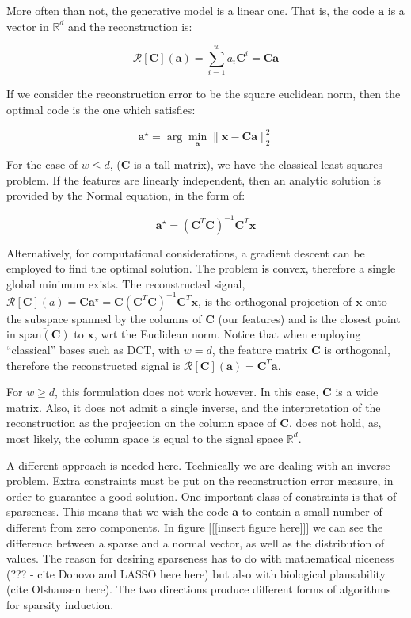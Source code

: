 \documentclass[12pt,a4paper,oneside,english]{UPBThesis}
\newcommand{\hcsignalspace}{\mathbb{R}^d}
\begin{document}
More often than not, the generative model is a linear one. That is, the code $\textbf{a}$ is a vector in $\hcsignalspace$ and the reconstruction is:

\begin{equation*}
\mathcal{R}[\textbf{C}](\textbf{a}) = \sum_{i=1}^{w}{a_i \textbf{C}^i} = \textbf{C}\textbf{a}
\end{equation*}

If we consider the reconstruction error to be the square euclidean norm, then the optimal code is the one which satisfies:

\begin{equation}
\textbf{a}^{\star} = \arg\min_{\textbf{a}} \| \textbf{x} - \textbf{C}\textbf{a} \|_2^2
\end{equation}

For the case of $w \leq d$, ($\textbf{C}$ is a tall matrix), we have the classical least-squares problem. If the features are linearly independent, then an analytic solution is provided by the Normal equation, in the form of:

\begin{equation}
\textbf{a}^{\star} = (\textbf{C}^T\textbf{C})^{-1}\textbf{C}^T\textbf{x}
\end{equation}

Alternatively, for computational considerations, a gradient descent can be employed to find the optimal solution. The problem is convex, therefore a single global minimum exists. The reconstructed signal, $\mathcal{R}[\textbf{C}](a) = \textbf{C}\textbf{a}^{\star} = \textbf{C}(\textbf{C}^T\textbf{C})^{-1}\textbf{C}^T\textbf{x}$, is the orthogonal projection of $\textbf{x}$ onto the subspace spanned by the columns of $\textbf{C}$ (our features) and is the closest point in $\overline{\text{span}(\textbf{C})}$ to $\textbf{x}$, wrt the Euclidean norm. Notice that when employing ``classical'' bases such as DCT, with $w = d$, the feature matrix $\textbf{C}$ is orthogonal, therefore the reconstructed signal is $\mathcal{R}[\textbf{C}](\textbf{a}) = \textbf{C}^T\textbf{a}$.

For $w \ge d$, this formulation does not work however. In this case, $\textbf{C}$ is a wide matrix. Also, it does not admit a single inverse, and the interpretation of the reconstruction as the projection on the column space of $\textbf{C}$, does not hold, as, most likely, the column space is equal to the signal space $\hcsignalspace$.

A different approach is needed here. Technically we are dealing with an inverse problem. Extra constraints must be put on the reconstruction error measure, in order to guarantee a good solution. One important class of constraints is that of sparseness. This means that we wish the code $\textbf{a}$ to contain a small number of different from zero components. In figure [[[insert figure here]]] we can see the difference between a sparse and a normal vector, as well as the distribution of values. The reason for desiring sparseness has to do with mathematical niceness (??? - cite Donovo and LASSO here here) but also with biological plausability (cite Olshausen here). The two directions produce different forms of algorithms for sparsity induction.
\end{document}
